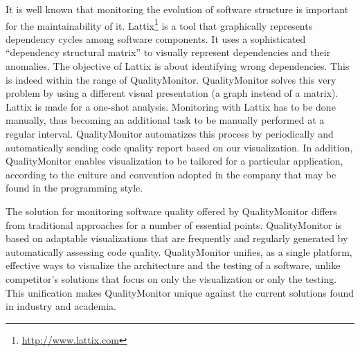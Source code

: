 \documentclass[runningheads]{llncs}
\begin{document}
It is well known that monitoring the evolution of software structure is important for the maintainability of it. Lattix\footnote{\url{http://www.lattix.com}} is a tool that graphically represents dependency cycles among software components. It uses a sophisticated ``dependency structural matrix'' to visually represent dependencies and their anomalies. The objective of Lattix is about identifying wrong dependencies. This is indeed within the range of QualityMonitor. QualityMonitor solves this very problem by using a different visual presentation (a graph instead of a matrix). Lattix is made for a one-shot analysis. Monitoring with Lattix has to be done manually, thus becoming an additional task to be manually performed at a regular interval. QualityMonitor automatizes this process by periodically and automatically sending code quality report based on our visualization. In addition, QualityMonitor enables visualization to be tailored for a particular application, according to the culture and convention adopted in the company that may be found in the programming style.

The solution for monitoring software quality offered by QualityMonitor differs from traditional approaches for a number of essential points. QualityMonitor is based on adaptable visualizations that are frequently and regularly generated by automatically assessing code quality. 
QualityMonitor unifies, as a single platform, effective ways to visualize the architecture and the testing of a software, unlike competitor's solutions that focus on only the visualization or only the testing. This unification makes QualityMonitor unique against the current solutions found in industry and academia.

\end{document}
